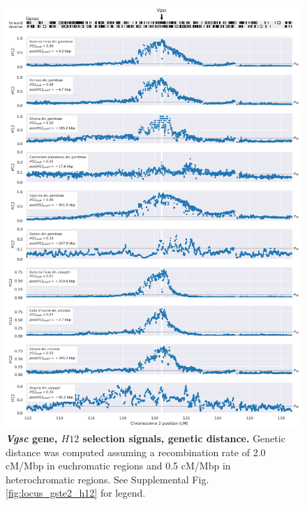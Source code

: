 \documentclass[a4paper,11pt,abstracton,hidelinks]{scrartcl}
\begin{document}
\begin{figure}[t!]
	\begin{center}
		\includegraphics*[width=1\linewidth,center]{artwork/locus_vgsc_h12_gdist.png}
	\end{center}
	\caption[\textit{Vgsc} gene, $H12$ selection signals, genetic distance]{
	\textbf{\textit{Vgsc} gene, $H12$ selection signals, genetic distance.}
	Genetic distance was computed assuming a recombination rate of 2.0 cM/Mbp in euchromatic regions and 0.5 cM/Mbp in heterochromatic regions.  
	See Supplemental Fig. \ref{fig:locus_gste2_h12} for legend.
	} 
	\label{fig:locus_vgsc_h12_gdist}
\end{figure}


\clearpage
\end{document}

